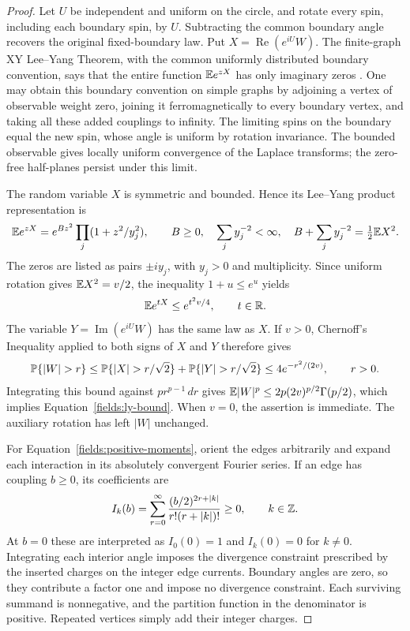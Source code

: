 \begin{proof}
Let $U$ be independent and uniform on the circle, and rotate every
spin, including each boundary spin, by $U$.  Subtracting the common
boundary angle recovers the original fixed-boundary law.  Put
$X=\operatorname{Re}(e^{iU}W)$.  The finite-graph XY Lee--Yang
Theorem, with the common uniformly distributed boundary convention,
says that the entire function $\mathbb E e^{zX}$ has only imaginary zeros
\cite[Theorem~1 and Remark~5]{NewmanWu2019}.
One may obtain this boundary convention on simple graphs by adjoining
a vertex of observable weight zero, joining it ferromagnetically to
every boundary vertex, and taking all these added couplings to infinity.
The limiting spins on the boundary equal the new spin, whose angle is
uniform by rotation invariance.  The bounded observable gives locally
uniform convergence of the Laplace transforms; the zero-free
half-planes persist under this limit.

The random variable $X$ is symmetric and bounded.  Hence its
Lee--Yang product representation
\cite[Proposition~13]{NewmanWu2019} is
\[
 \mathbb E e^{zX}
   =e^{Bz^2}\prod_j(1+z^2/y_j^2),\qquad
 B\geq0,\quad \sum_jy_j^{-2}<\infty,\quad
 B+\sum_jy_j^{-2}=\tfrac12\mathbb E X^2.
\]
The zeros are listed as pairs $\pm i y_j$, with $y_j>0$ and
multiplicity.  Since uniform rotation gives $\mathbb E X^2=v/2$, the
inequality $1+u\leq e^u$ yields
\begin{equation}\label{fields:ly-laplace}
 \mathbb E e^{tX}\leq e^{t^2v/4},\qquad t\in\mathbb R.
\end{equation}
The variable $Y=\operatorname{Im}(e^{iU}W)$ has the same law as $X$.
If $v>0$, Chernoff's Inequality applied to both signs of $X$ and $Y$
therefore gives
\[
 \Pbb\{|W|>r\}
 \leq \Pbb\{|X|>r/\sqrt2\}+\Pbb\{|Y|>r/\sqrt2\}
 \leq4e^{-r^2/(2v)},\qquad r>0.
\]
Integrating this bound against $p r^{p-1}\,dr$ gives
$\mathbb E|W|^p\leq2p(2v)^{p/2}\Gamma(p/2)$, which implies
Equation~\eqref{fields:ly-bound}.  When $v=0$, the assertion is
immediate.  The auxiliary rotation has left $|W|$ unchanged.

For Equation~\eqref{fields:positive-moments}, orient the edges
arbitrarily and expand each interaction in its absolutely convergent
Fourier series.  If an edge has coupling $b\geq0$, its coefficients are
\[
 I_k(b)=\sum_{r=0}^\infty
       \frac{(b/2)^{2r+|k|}}{r!(r+|k|)!}\geq0,
 \qquad k\in\mathbb Z.
\]
At $b=0$ these are interpreted as $I_0(0)=1$ and $I_k(0)=0$
for $k\ne0$.  Integrating each interior angle imposes the divergence
constraint prescribed by the inserted charges on the integer edge
currents.  Boundary angles are zero, so they contribute a factor one
and impose no divergence constraint.  Each surviving summand is
nonnegative, and the partition function in the denominator is
positive.  Repeated vertices simply add their integer charges.
\end{proof}

